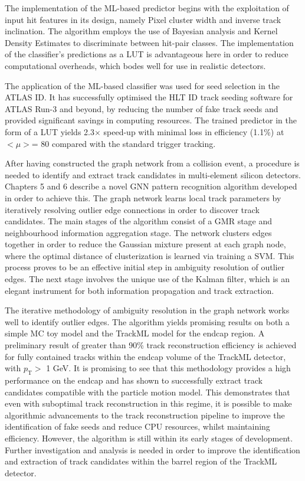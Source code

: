 The implementation of the ML-based predictor begins with the exploitation of input hit features in its design, namely Pixel cluster width and inverse track inclination. The algorithm employs the use of Bayesian analysis and Kernel Density Estimates to discriminate between hit-pair classes. The implementation of the classifier’s predictions as a LUT is advantageous here in order to reduce computational overheads, which bodes well for use in realistic detectors.

The application of the ML-based classifier was used for seed selection in the ATLAS ID. It has successfully optimised the HLT ID track seeding software for ATLAS Run-3 and beyond, by reducing the number of fake track seeds and provided significant savings in computing resources. The trained predictor in the form of a LUT yields 2.3$\times$ speed-up with minimal loss in efficiency (1.1\%) at $< \mu >$= 80 compared with the standard trigger tracking. 





After having constructed the graph network from a collision event, a procedure is needed to identify and extract track candidates in multi-element silicon detectors. Chapters 5 and 6 describe a novel GNN pattern recognition algorithm developed in order to achieve this. The graph network learns local track parameters by iteratively resolving outlier edge connections in order to discover track candidates. The main stages of the algorithm consist of a GMR stage and neighbourhood information aggregation stage. The network clusters edges together in order to reduce the Gaussian mixture present at each graph node, where the optimal distance of clusterization is learned via training a SVM. This process proves to be an effective initial step in ambiguity resolution of outlier edges. The next stage involves the unique use of the Kalman filter, which is an elegant instrument for both information propagation and track extraction. 

The iterative methodology of ambiguity resolution in the graph network works well to identify outlier edges. The algorithm yields promising results on both a simple MC toy model and the TrackML model for the endcap region. A preliminary result of greater than 90\% track reconstruction efficiency is achieved for fully contained tracks within the endcap volume of the TrackML detector, with $p_{\text{T}} >$ 1 GeV. It is promising to see that this methodology provides a high performance on the endcap and has shown to successfully extract track candidates compatible with the particle motion model. This demonstrates that even with suboptimal track reconstruction in this regime, it is possible to make algorithmic advancements to the track reconstruction pipeline to improve the identification of fake seeds and reduce CPU resources, whilst maintaining efficiency. However, the algorithm is still within its early stages of development. Further investigation and analysis is needed in order to improve the identification and extraction of track candidates within the barrel region of the TrackML detector.


